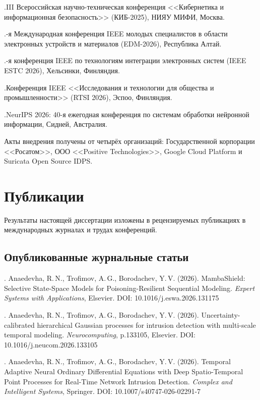 .\quad III Всероссийская научно-техническая конференция <<Кибернетика и информационная безопасность>> (КИБ-2025), НИЯУ МИФИ, Москва.

.-я Международная конференция IEEE молодых специалистов в области электронных устройств и материалов (EDM-2026), Республика Алтай.

.-я конференция IEEE по технологиям интеграции электронных систем (IEEE ESTC 2026), Хельсинки, Финляндия.

.\quad Конференция IEEE <<Исследования и технологии для общества и промышленности>> (RTSI 2026), Эспоо, Финляндия.

.\quad NeurIPS 2026: 40-я ежегодная конференция по системам обработки нейронной информации, Сидней, Австралия.

Акты внедрения получены от четырёх организаций: Государственной корпорации <<Росатом>>, ООО <<Positive Technologies>>, Google Cloud Platform и Suricata Open Source IDPS.


\section*{Публикации}

Результаты настоящей диссертации изложены в рецензируемых публикациях в международных журналах и трудах конференций.

\subsection*{Опубликованные журнальные статьи}

. Anaedevha, R.\,N., Trofimov, A.\,G., Borodachev, Y.\,V. (2026). MambaShield: Selective State-Space Models for Poisoning-Resilient Sequential Modeling. \textit{Expert Systems with Applications}, Elsevier. DOI: 10.1016/j.eswa.2026.131175

. Anaedevha, R.\,N., Trofimov, A.\,G., Borodachev, Y.\,V. (2026). Uncertainty-calibrated hierarchical Gaussian processes for intrusion detection with multi-scale temporal modeling. \textit{Neurocomputing}, p.133105, Elsevier. DOI: 10.1016/j.neucom.2026.133105

. Anaedevha, R.\,N., Trofimov, A.\,G., Borodachev, Y.\,V. (2026). Temporal Adaptive Neural Ordinary Differential Equations with Deep Spatio-Temporal Point Processes for Real-Time Network Intrusion Detection. \textit{Complex and Intelligent Systems}, Springer. DOI: 10.1007/s40747-026-02291-7

